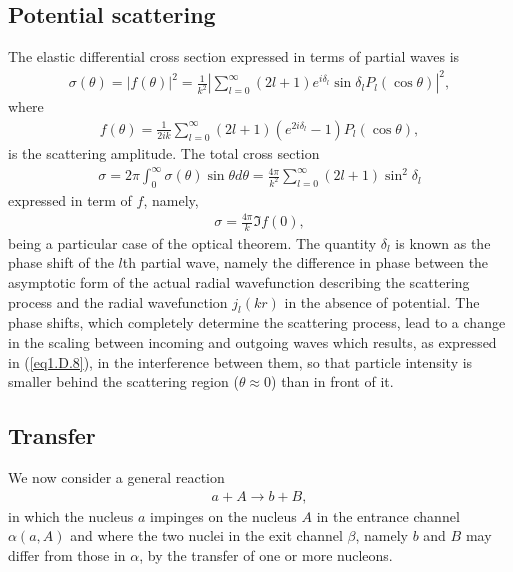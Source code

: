 \begin{subappendices}
\subsection{Potential scattering}
The elastic differential cross section expressed in terms of partial waves is
\begin{align}\label{eq1.D.5}
\sigma(\theta)=|f(\theta)|^2=\frac{1}{k^2}\left|\sum_{l=0}^\infty(2l+1)e^{i\delta_l}\sin\delta_lP_l(\cos\theta)\right|^2,
\end{align}
where
\begin{align}\label{eq1.D.6}
f(\theta)=\frac{1}{2ik}\sum_{l=0}^\infty(2l+1)\left(e^{2i\delta_l}-1\right) P_l(\cos\theta),
\end{align}
is the scattering amplitude. The total cross section 
\begin{align}\label{eq1.D.7}
\sigma=2\pi\int_0^\infty\sigma(\theta)\sin\theta d\theta=\frac{4\pi}{k^2}\sum_{l=0}^\infty(2l+1)\sin^2\delta_l
\end{align}
expressed in term of $f$, namely,
\begin{align}\label{eq1.D.8}
\sigma=\frac{4\pi}{k}\Im f(0),
\end{align}
being a particular case of the optical theorem. The quantity $\delta_l$ is known as the phase shift of the $l$th partial wave, namely the difference in phase between the asymptotic form of the actual radial wavefunction describing the scattering process and the radial wavefunction $j_l(kr)$ in the absence of potential. The phase shifts, which completely determine the scattering process, lead to a change in the scaling between incoming and outgoing waves which results, as expressed in (\ref{eq1.D.8}), in the interference between them, so that particle intensity is smaller behind the scattering region ($\theta\approx0$) than in front of it. 
\subsection{Transfer}
We now consider a general reaction
\begin{align}\label{eq1.D.9}
a+A\rightarrow b+B,
\end{align}
in which the nucleus $a$ impinges on the nucleus $A$ in the entrance channel $\alpha(a,A)$ and where the two nuclei in the exit channel $\beta$, namely $b$ and $B$ may differ from those in $\alpha$, by the transfer of one or more nucleons.





\end{subappendices}
